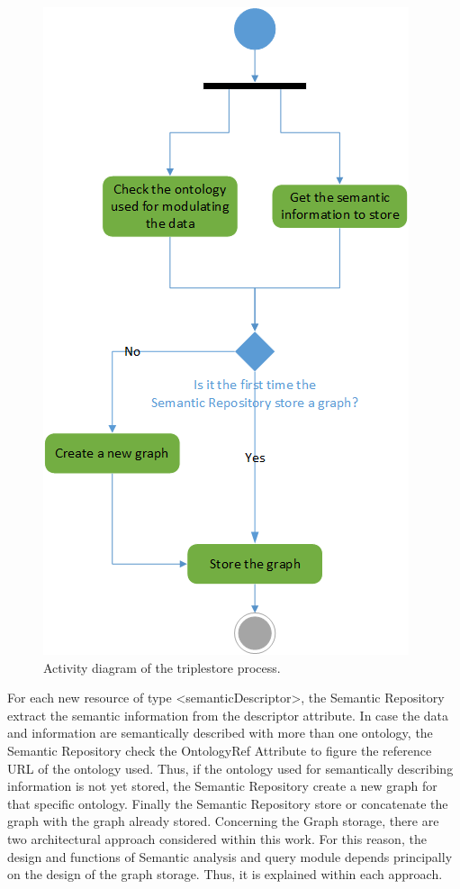 \begin{figure}[htbp]
    \centering
    \includegraphics[width=.6\textwidth]{resources/images/storage}
    \caption{Activity diagram of the triplestore process. }\label{fig:contrib2:store}
\end{figure}
For each new resource of type <semanticDescriptor>, the Semantic Repository extract the semantic information from the descriptor attribute. In case the data and information are semantically described with more than one ontology, the Semantic Repository check the OntologyRef Attribute to figure the reference URL of the ontology used. Thus, if the ontology used for semantically describing information is not yet stored, the Semantic Repository create a new graph for that specific ontology. Finally the Semantic Repository store or concatenate the graph with the graph already stored. Concerning the Graph storage, there are two architectural approach considered within this work. For this reason, the design and functions of Semantic analysis and query module depends principally on the design of the graph storage. Thus, it is explained within each approach.


